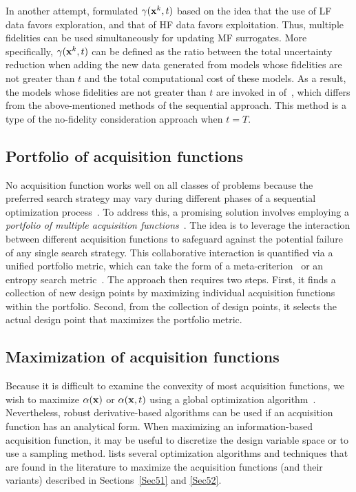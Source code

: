 \documentclass[journal ]{new-aiaa}
\begin{document}
	In another attempt, \citet{Meliani2019} formulated $\gamma({\bf x}^k,t)$ based on the idea that the use of LF data favors exploration, and that of HF data favors exploitation.
	Thus, multiple fidelities can be used simultaneously for updating MF surrogates.
	More specifically, $\gamma({\bf x}^k,t)$ can be defined as the ratio between the total uncertainty reduction when adding the new data generated from models whose fidelities are not greater than $t$ and the total computational cost of these models.
	As a result, the models whose fidelities are not greater than $t$ are invoked in  of~, which differs from the above-mentioned methods of the sequential approach.
	This method is a type of the no-fidelity consideration approach when $t=T$.
	
	\subsection{Portfolio of acquisition functions}\label{Sec53}
	
	No acquisition function works well on all classes of problems because the preferred search strategy may vary during different phases of a sequential optimization process~\citep{Shahriari2016}.
	To address this, a promising solution involves employing a \textit{portfolio of multiple acquisition functions}~\citep{Hoffman2014,Shahriari2014}.
	The idea is to leverage the interaction between different acquisition functions to safeguard against the potential failure of any single search strategy.
	This collaborative interaction is quantified via a unified portfolio metric, which can take the form of a meta-criterion~\citep{Hoffman2014} or an entropy search metric~\citep{Shahriari2014}.
	The approach then requires two steps.
	First, it finds a collection of new design points by maximizing individual acquisition functions within the portfolio.
	Second, from the collection of design points, it selects the actual design point that maximizes the portfolio metric.
	
	\subsection{Maximization of acquisition functions}\label{Sec54}
	
	Because it is difficult to examine the convexity of most acquisition functions, we wish to maximize $\alpha({\bf x})$ or $\alpha({\bf x},t)$ using a global optimization algorithm~\citep{Neumaier2004}.
	Nevertheless, robust derivative-based algorithms can be used if an acquisition function has an analytical form.
	When maximizing an information-based acquisition function, it may be useful to discretize the design variable space or to use a sampling method.
	 lists several optimization algorithms and techniques that are found in the literature to maximize the acquisition functions (and their variants) described in Sections~\ref{Sec51} and \ref{Sec52}.
	
\end{document}
